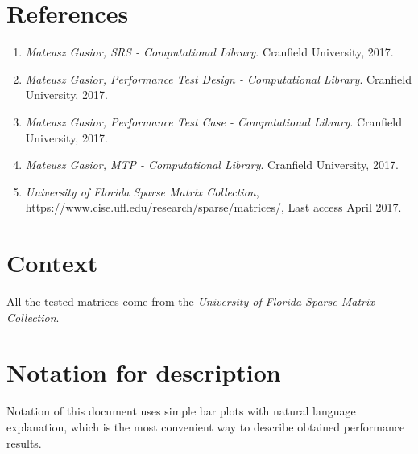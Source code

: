 \section{References} \label{s:introduction:references}
	\begin{comment}
		List all of the applicable reference documents. The references are separated into “external” references
		that are imposed external to the project and “internal” references that are imposed from within to the
		project. This may also be at the end of the document.
	\end{comment}
	\begin{enumerate}
		\item \emph{Mateusz Gasior, \gls{SRS} - Computational Library}. Cranfield University, 2017.
		\item \emph{Mateusz Gasior, Performance Test Design - Computational Library}. Cranfield University, 2017.
		\item \emph{Mateusz Gasior, Performance Test Case - Computational Library}. Cranfield University, 2017.
		\item \emph{Mateusz Gasior, \gls{MTP} - Computational Library}. Cranfield University, 2017.
		\item \emph{University of Florida Sparse Matrix Collection}, \url{https://www.cise.ufl.edu/research/sparse/matrices/}, Last access April 2017.
	\end{enumerate}
\section{Context} \label{s:introduction:context}
	\begin{comment}
		Provide any required context that is not already covered by other sections of this document (e.g., thirdparty
		testing via the Internet).
	\end{comment}
	All the tested matrices come from the \emph{University of Florida Sparse Matrix Collection}.
\section{Notation for description} \label{s:introduction:notation-for-description}
	\begin{comment}
		Define any numbering schemes, e.g., for scenarios and test cases. The intent of this section is to
		explain any such schema.
	\end{comment}
	Notation of this document uses simple bar plots with natural language explanation, which is the most convenient way to describe obtained performance results.
	